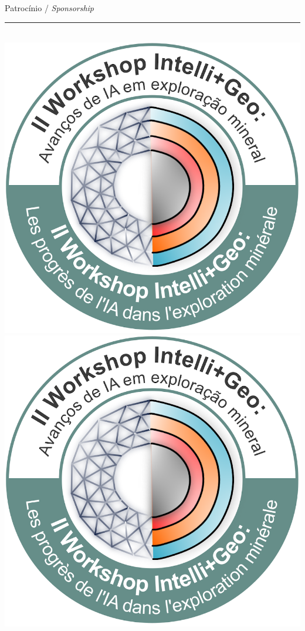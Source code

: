 \documentclass[11pt]{article} %
\begin{document}
{{\begin{multicols}{2}
\begin{flushleft}
            \end{flushleft}
            \begin{flushright}
                \center Patrocínio / \textit{Sponsorship}\\
                \vspace{-0.5cm} 
                \center \rule{0.25\textwidth}{0.4pt} \thepage \\
                \vspace{0.1cm} 
                \includegraphics[scale=0.05]{./logo.png}
                \includegraphics[scale=0.05]{./logo.png}
            \end{flushright}
        \end{multicols}
    }
}
\end{document}
